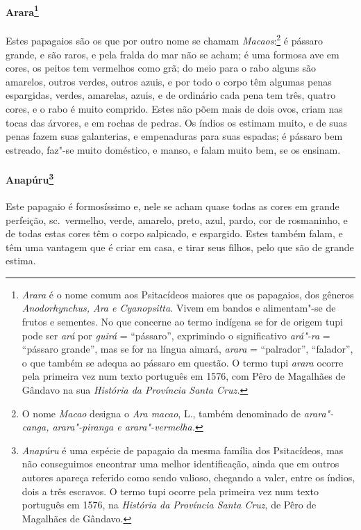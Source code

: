 \paragraph{Arara\footnote{ \textit{Arara} é o nome comum aos
Psitacídeos maiores que os papagaios, dos gêneros
\textit{Anodorhynchus, Ara e Cyanopsitta.} Vivem em bandos e
alimentam"-se de frutos e sementes. No que concerne ao termo indígena se
for de origem tupi pode ser \textit{ará} por \textit{guirá} = ``pássaro'', 
exprimindo o significativo \textit{ará"-ra} = ``pássaro
grande'', mas se for na língua aimará, \textit{arara} = ``palrador'',
``falador'', o que também se adequa ao pássaro em questão. O termo tupi
\textit{arara} ocorre pela primeira vez num texto português em 1576,
com Pêro de Magalhães de Gândavo na sua \textit{História da Província 
Santa Cruz.} }} Estes papagaios são os que por outro nome se
chamam \textit{Macaos}:\footnote{ O nome \textit{Macao} designa o
\textit{Ara macao}, L., também denominado de \textit{arara"-canga,
arara"-piranga e arara"-vermelha.}} é pássaro grande, e são raros, e pela
fralda do mar não se acham; é uma formosa ave em cores, os peitos tem
vermelhos como grã; do meio para o rabo alguns são amarelos, outros
verdes, outros azuis, e por todo o corpo têm algumas penas espargidas,
verdes, amarelas, azuis, e de ordinário cada pena tem três, quatro
cores, e o rabo é muito comprido. Estes não põem mais de dois ovos,
criam nas tocas das árvores, e em rochas de pedras. Os índios os
estimam muito, e de suas penas fazem suas galanterias, e empenaduras
para suas espadas; é pássaro bem estreado, faz"-se muito doméstico, e
manso, e falam muito bem, se os ensinam.

\paragraph{Anapúru\footnote{ \textit{Anapúru} é uma espécie de
papagaio da mesma família dos Psitacídeos, mas não conseguimos
encontrar uma melhor identificação, ainda que em outros autores apareça
referido como sendo valioso, chegando a valer, entre os índios, dois a
três escravos. O termo tupi ocorre pela primeira vez num texto
português em 1576, na \textit{História da Província Santa Cruz}, de
Pêro de Magalhães de Gândavo.}} Este papagaio é formosíssimo e, nele
se acham quase todas as cores em grande perfeição, sc.~vermelho,
verde, amarelo, preto, azul, pardo, cor de rosmaninho, e de todas estas
cores têm o corpo salpicado, e espargido. Estes também falam, e têm uma
vantagem que é criar em casa, e tirar seus filhos, pelo que são de grande estima. 

